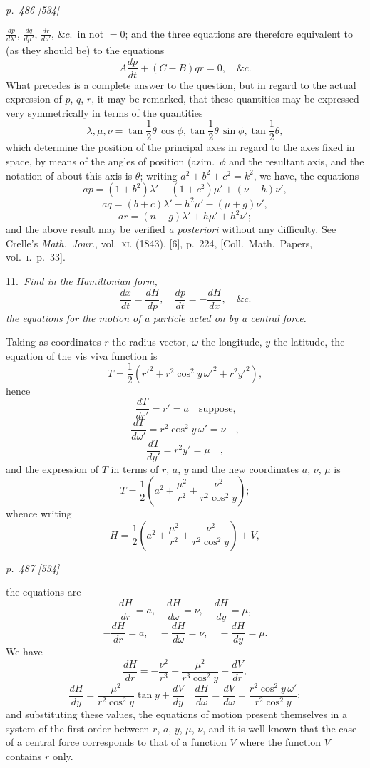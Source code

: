 \documentclass[11pt,a4paper]{book}
\begin{document}
\clearpage

\bigskip
\textit{p.~486 [534]}
\smallskip

\noindent
$\frac{dp}{d\lambda'}$, $\frac{dq}{d\mu'}$, $\frac{dr}{d\nu'}$, $\&c.$\, in not $= 0$; and the three equations are therefore equivalent to (as
they should be) to the equations
\[
A\frac{dp}{dt} + (C - B)qr = 0, \quad \&c.
\]
What precedes is a complete answer to the question, but in regard to the actual
expression of $p$, $q$, $r$, it may be remarked, that these quantities may be expressed very
symmetrically in terms of the quantities
\[
\lambda, \mu, \nu = \tan\frac{1}{2}\theta\,\cos\phi, \tan\frac{1}{2}\theta\,\sin\phi, \tan\frac{1}{2}\theta,
\]
which determine the position of the principal axes in regard to the axes fixed in
space, by means of the angles of position (azim.\ $\phi$ and the resultant axis, and the
notation of about this axis is $\theta$; writing $a^2 + b^2 + c^2 = k^2$, we have, the equations
\[
ap = (1 + b^2)\lambda' - (1 + c^2)\mu' + (\nu - h)\nu',
\]
\[
aq = (b + c)\lambda' - h^2\mu' - (\mu + g)\nu',
\]
\[
ar = (n - g)\lambda' + h\mu' + h^2\nu';
\]
and the above result may be verified \textit{a posteriori} without any difficulty. See Crelle's
\textit{Math.\ Jour.}, vol.\ \textsc{xi}. (1843), [6], p.~224, [Coll.\ Math.\ Papers, vol.\ \textsc{i}.\ p.~33].

\smallskip
\noindent\textsc{11.}\, \textit{Find in the Hamiltonian form,}
\[
\frac{dx}{dt} = \frac{dH}{dp}, \quad \frac{dp}{dt} = -\frac{dH}{dx}, \quad \&c.
\]
\textit{the equations for the motion of a particle acted on by a central force.}

Taking as coordinates $r$ the radius vector, $\omega$ the longitude, $y$ the latitude, the
equation of the vis viva function is
\[
T = \frac{1}{2}(r'^2 + r^2\cos^2 y\,\omega'^2 + r^2 y'^2),
\]
hence
\[
\frac{dT}{dr'} = r' = a \quad \text{suppose,}
\]
\[
\frac{dT}{d\omega'} = r^2\cos^2 y\,\omega' = \nu \quad ,
\]
\[
\frac{dT}{dy'} = r^2 y' = \mu \quad ,
\]
and the expression of $T$ in terms of $r$, $a$, $y$ and the new coordinates $a$, $\nu$, $\mu$ is
\[
T = \frac{1}{2}\left(a^2 + \frac{\mu^2}{r^2} + \frac{\nu^2}{r^2\cos^2 y}\right);
\]
whence writing
\[
H = \frac{1}{2}\left(a^2 + \frac{\mu^2}{r^2} + \frac{\nu^2}{r^2\cos^2 y}\right) + V,
\]

\clearpage

\bigskip
\textit{p.~487 [534]}
\smallskip

\noindent
the equations are
\[
\frac{dH}{dr} = a, \quad \frac{dH}{d\omega} = \nu, \quad \frac{dH}{dy} = \mu,
\]
\[
-\frac{dH}{dr} = a, \quad -\frac{dH}{d\omega} = \nu, \quad -\frac{dH}{dy} = \mu.
\]
We have
\[
\frac{dH}{dr} = -\frac{\nu^2}{r^3} - \frac{\mu^2}{r^3\cos^2 y} + \frac{dV}{dr},
\]
\[
\frac{dH}{dy} = \frac{\mu^2}{r^2\cos^2 y}\tan y + \frac{dV}{dy} \quad \frac{dH}{d\omega} = \frac{dV}{d\omega} = \frac{r^2\cos^2 y\,\omega'}{r^2\cos^2 y};
\]
and substituting these values, the equations of motion present themselves in a system
of the first order between $r$, $a$, $y$, $\mu$, $\nu$, and it is well known that the
case of a central force corresponds to that of a function $V$ where the function
$V$ contains $r$ only.
\end{document}
